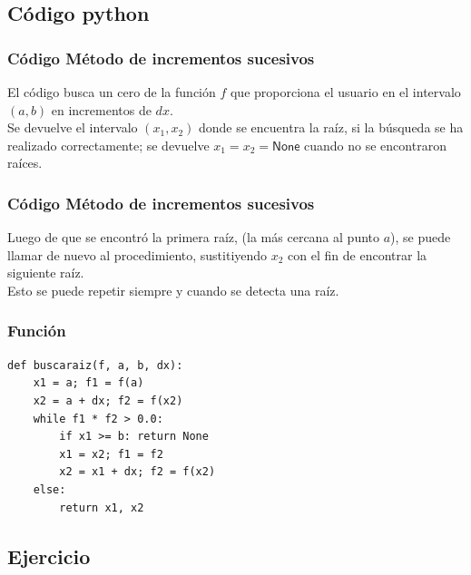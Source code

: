 \documentclass[12pt]{beamer}
\begin{document}
\subsection{Código python}

\begin{frame}
\frametitle{Código Método de incrementos sucesivos}
El código busca un cero de la función $f$ que proporciona el usuario en el intervalo
$(a, b)$ en incrementos de $dx$.
\\
\bigskip
\pause
Se devuelve el intervalo $(x_{1}, x_{2})$ donde se encuentra la raíz, si la búsqueda
se ha realizado correctamente; se devuelve $x_{1} = x_{2} = \mathsf{None}$ cuando no se encontraron raíces.
\end{frame}
\begin{frame}
\frametitle{Código Método de incrementos sucesivos}
Luego de que se encontró la primera raíz, (la más cercana al punto $a$), se puede llamar de nuevo al procedimiento, sustitiyendo $x_{2}$ con el fin de encontrar la siguiente raíz. 
\\
\bigskip
\pause
Esto se puede repetir siempre y cuando se detecta una raíz.
\end{frame}
\begin{frame}[fragile]
\frametitle{Función }
\begin{lstlisting}[caption=Función buscaraiz para encontrar un intervalo que contiene una raíz]
def buscaraiz(f, a, b, dx):
    x1 = a; f1 = f(a)
    x2 = a + dx; f2 = f(x2)
    while f1 * f2 > 0.0:
        if x1 >= b: return None
        x1 = x2; f1 = f2
        x2 = x1 + dx; f2 = f(x2)
    else:
        return x1, x2
\end{lstlisting}
\end{frame}

\subsection{Ejercicio}
\end{document}

